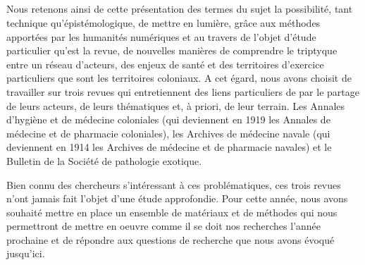 \subsection*{}

Nous retenons ainsi de cette présentation des termes du sujet la possibilité, tant technique qu'épistémologique, de mettre en lumière, grâce aux méthodes apportées par les humanités numériques et au travers de l'objet d'étude particulier qu'est la revue, de nouvelles manières de comprendre le triptyque entre un réseau d'acteurs, des enjeux de santé et des territoires d'exercice particuliers que sont les territoires coloniaux. A cet égard, nous avons choisit de travailler sur trois revues qui entretiennent des liens particuliers de par le partage de leurs acteurs, de leurs thématiques et, à priori, de leur terrain. Les Annales d'hygiène et de médecine coloniales (qui deviennent en 1919 les Annales de médecine et de pharmacie coloniales), les Archives de médecine navale (qui deviennent en 1914 les Archives de médecine et de pharmacie navales) et le Bulletin de la Société de pathologie exotique.

Bien connu des chercheurs s’intéressant à ces problématiques, ces trois revues n'ont jamais fait l'objet d'une étude approfondie.  Pour cette année, nous avons souhaité mettre en place un ensemble de matériaux et de méthodes qui nous permettront de mettre en oeuvre comme il se doit nos recherches l'année prochaine et de répondre aux questions de recherche que nous avons évoqué jusqu'ici.

